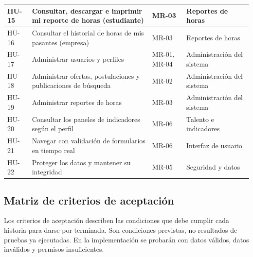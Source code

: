 \begin{longtable}{@{}>{\raggedright\arraybackslash}p{2.2cm}>{\raggedright\arraybackslash}p{7.5cm}>{\raggedright\arraybackslash}p{2.5cm}>{\raggedright\arraybackslash}p{3.8cm}@{}}
	\hline
	HU-15 & Consultar, descargar e imprimir mi reporte de horas (estudiante) & MR-03 & Reportes de horas \\
	\hline
	HU-16 & Consultar el historial de horas de mis pasantes (empresa) & MR-03 & Reportes de horas \\
	\hline
	HU-17 & Administrar usuarios y perfiles & MR-01, MR-04 & Administración del sistema \\
	\hline
	HU-18 & Administrar ofertas, postulaciones y publicaciones de búsqueda & MR-02 & Administración del sistema \\
	\hline
	HU-19 & Administrar reportes de horas & MR-03 & Administración del sistema \\
	\hline
	HU-20 & Consultar los paneles de indicadores según el perfil & MR-06 & Talento e indicadores \\
	\hline
	HU-21 & Navegar con validación de formularios en tiempo real & MR-06 & Interfaz de usuario \\
	\hline
	HU-22 & Proteger los datos y mantener su integridad & MR-05 & Seguridad y datos \\
\end{longtable}




\subsection{Matriz de criterios de aceptación}
Los criterios de aceptación describen las condiciones que debe cumplir cada historia para darse
por terminada. Son condiciones previstas, no resultados de pruebas ya ejecutadas. En la
implementación se probarán con datos válidos, datos inválidos y permisos insuficientes.

